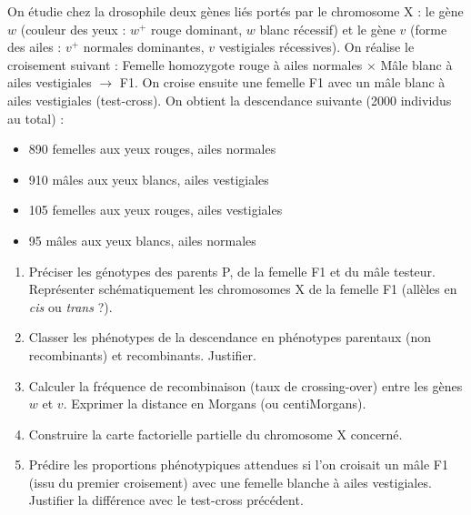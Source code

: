 \documentclass[11pt]{article}
\begin{document}
\begin{exercice}
On étudie chez la drosophile deux gènes liés portés par le chromosome X : le gène $w$ (couleur des yeux : $w^+$ rouge dominant, $w$ blanc récessif) et le gène $v$ (forme des ailes : $v^+$ normales dominantes, $v$ vestigiales récessives). On réalise le croisement suivant :
\og Femelle homozygote rouge à ailes normales $\times$ Mâle blanc à ailes vestigiales \fg $\rightarrow$ F1.
On croise ensuite une femelle F1 avec un mâle blanc à ailes vestigiales (test-cross). On obtient la descendance suivante (2000 individus au total) :
\begin{itemize}
\item 890 femelles aux yeux rouges, ailes normales
\item 910 mâles aux yeux blancs, ailes vestigiales
\item 105 femelles aux yeux rouges, ailes vestigiales
\item 95 mâles aux yeux blancs, ailes normales
\end{itemize}

\begin{enumerate}
\item Préciser les génotypes des parents P, de la femelle F1 et du mâle testeur. Représenter schématiquement les chromosomes X de la femelle F1 (allèles en \textit{cis} ou \textit{trans} ?).
\item Classer les phénotypes de la descendance en phénotypes parentaux (non recombinants) et recombinants. Justifier.
\item Calculer la fréquence de recombinaison (taux de crossing-over) entre les gènes $w$ et $v$. Exprimer la distance en Morgans (ou centiMorgans).
\item Construire la carte factorielle partielle du chromosome X concerné.
\item Prédire les proportions phénotypiques attendues si l'on croisait un mâle F1 (issu du premier croisement) avec une femelle blanche à ailes vestigiales. Justifier la différence avec le test-cross précédent.
\end{enumerate}
\end{exercice}
\end{document}
